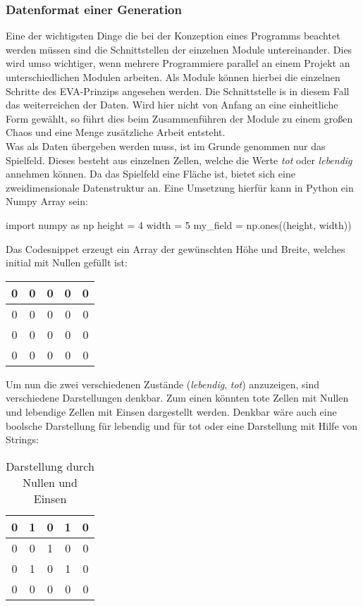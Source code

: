 \subsubsection{Datenformat einer Generation} \label{sec:Datenformat}
Eine der wichtigsten Dinge die bei der Konzeption eines Programms beachtet werden müssen sind die Schnittstellen der einzelnen Module untereinander. Dies wird umso wichtiger, wenn mehrere Programmiere parallel an einem Projekt an unterschiedlichen Modulen arbeiten. Als Module können hierbei die einzelnen Schritte des EVA-Prinzips angesehen werden. Die Schnittstelle is in diesem Fall das weiterreichen der Daten. Wird hier nicht von Anfang an eine einheitliche Form gewählt, so führt dies beim Zusammenführen der Module zu einem großen Chaos und eine Menge zusätzliche Arbeit entsteht.\\
Was als Daten übergeben werden muss, ist im Grunde genommen nur das Spielfeld. Dieses besteht aus einzelnen Zellen, welche die Werte \textit{tot} oder \textit{lebendig} annehmen können.  Da das Spielfeld eine Fläche ist, bietet sich eine zweidimensionale Datenstruktur an. Eine Umsetzung hierfür kann in Python ein Numpy Array sein:
\begin{python}
import numpy as np
height = 4
width = 5
my_field = np.ones((height, width))
\end{python}
Das Codesnippet erzeugt ein Array der gewünschten Höhe und Breite, welches initial mit Nullen gefüllt ist:
\begin{table}[H]
	\center
	\begin{tabular}{|c|c|c|c|c|}
		\hline
		0  & 0& 0 & 0 & 0 \\ \hline
		0  & 0& 0 & 0 & 0\\ \hline
		0  & 0& 0 & 0 & 0\\ \hline
		0  & 0& 0 & 0 & 0\\ \hline
	\end{tabular}
\end{table}
Um nun die zwei verschiedenen Zustände (\textit{lebendig}, \textit{tot}) anzuzeigen, sind verschiedene Darstellungen denkbar. Zum einen könnten tote Zellen mit Nullen und lebendige Zellen mit Einsen dargestellt werden. Denkbar wäre auch eine boolsche Darstellung  für lebendig und  für tot oder eine Darstellung mit Hilfe von Strings:\\


\begin{table}[H]
	\center
	\begin{tabular}{|c|c|c|c|c|}
	\hline
	0  & 1& 0 & 1 & 0 \\ \hline
	0  & 0& 1 & 0 & 0\\ \hline
	0  & 1& 0 & 1 & 0\\ \hline
	0  & 0& 0 & 0 & 0\\ \hline
	\end{tabular}
	\caption*{Darstellung durch Nullen und Einsen}
\end{table}

